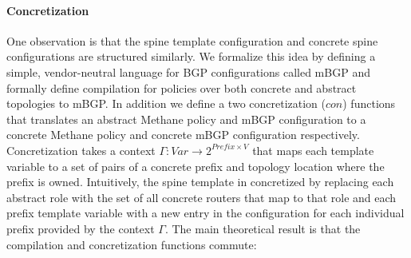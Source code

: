 \documentclass[numbers, 10pt, preprint]{sigplanconf}
\newcommand{\IE}{\emph{i.e.}}
\newcommand{\sysname}{{\small \sf Methane}\xspace}
\newcommand{\mbgp}{{\small \sf mBGP}\xspace}
\newcommand{\para}[1]{\paragraph*{\textbf{#1}}}
\begin{document}



\para{Concretization}

One observation is that the spine template configuration and concrete spine configurations are structured similarly. We formalize this idea by defining a simple, vendor-neutral language for BGP configurations called \mbgp and formally define compilation for policies over both concrete and abstract topologies to \mbgp. In addition we define a two concretization ($con$) functions that translates an abstract \sysname policy and \mbgp configuration to a concrete \sysname policy and concrete \mbgp configuration respectively. Concretization takes a context $\Gamma : \mathit{Var} \rightarrow 2^{\mathit{Prefix} \times V}$ that maps each template variable to a set of pairs of a concrete prefix and topology location where the prefix is owned. Intuitively, the spine template in concretized by replacing each abstract role with the set of all concrete routers that map to that role and each prefix template variable with a new entry in the configuration for each individual prefix provided by the context $\Gamma$.
The main theoretical result is that the compilation and concretization functions commute:


%
\end{document}
